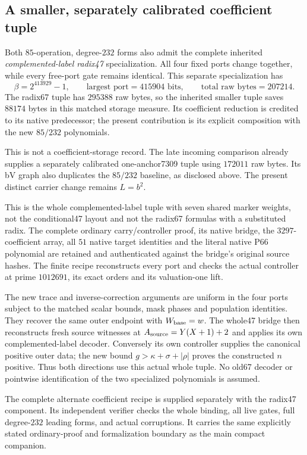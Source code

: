 \subsection{A smaller, separately calibrated coefficient tuple}

Both $85$-operation, degree-$232$ forms also admit the complete inherited
\emph{complemented-label radix47} specialization.  All four fixed ports
change together, while every free-port gate remains identical.  This
separate specialization has
\[
 \beta=2^{413929}-1,\qquad
 \text{largest port}=415904\text{ bits},\qquad
 \text{total raw bytes}=207214.
\]
The radix67 tuple has $295388$ raw bytes, so the inherited smaller tuple
saves $88174$ bytes in this matched storage measure.  Its coefficient
reduction is credited to its native predecessor; the present contribution
is its explicit composition with the new $85/232$ polynomials.

This is not a coefficient-storage record.  The late incoming comparison
already supplies a separately calibrated one-anchor7309 tuple using
$172011$ raw bytes.  Its bV graph also duplicates the $85/232$ baseline,
as disclosed above.  The present distinct carrier change remains $L=b^2$.

This is the whole complemented-label tuple with seven shared marker weights,
not the conditional47 layout and not the radix67 formulas with a substituted
radix.  The complete ordinary carry/controller proof, its native bridge,
the $3297$-coefficient array, all $51$ native target identities and the
literal native P66 polynomial are retained and authenticated against the
bridge's original source hashes.  The finite recipe reconstructs every
port and checks the actual controller at prime $1012691$, its exact orders
and its valuation-one lift.

The new trace and inverse-correction arguments are uniform in the four
ports subject to the matched scalar bounds, mask phases and population
identities.  They recover the same outer endpoint with $W_{\rm base}=w$.
The whole47 bridge then reconstructs fresh source witnesses at
$A_{\rm source}=Y(X+1)+2$ and applies its own complemented-label decoder.
Conversely its own controller supplies the canonical positive outer data;
the new bound $g>\kappa+\sigma+|\rho|$ proves the constructed $n$ positive.
Thus both directions use this actual whole tuple.  No old67 decoder or
pointwise identification of the two specialized polynomials is assumed.

The complete alternate coefficient recipe is supplied separately with the
radix47 component.  Its independent verifier checks the whole binding,
all live gates, full degree-$232$ leading forms, and actual corruptions.
It carries the same explicitly stated ordinary-proof and formalization
boundary as the main compact companion.
